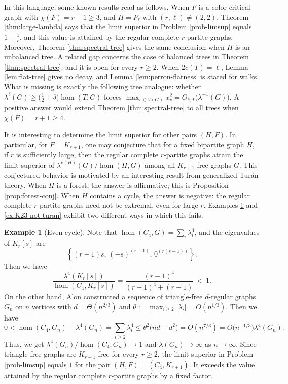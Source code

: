 \documentclass[11pt, a4paper]{article}
\theoremstyle{definition}
\newtheorem{example}[theorem]{Example}
\theoremstyle{plain}
\renewcommand{\le}{\leqslant}
\renewcommand{\ge}{\geqslant}
\begin{document}
In this language, some known results read as follows.
When $F$ is a color-critical graph with
$\chi (F)=r+1\ge 3$, and $H=P_\ell$ with $(r,\ell) \neq (2,2)$, Theorem \ref{thm:large-lambda} says that the limit superior in
Problem \ref{prob-limsup} equals $1-\frac{1}{r}$, and this value is attained by
the regular complete $r$-partite graphs. Moreover, Theorem \ref{thm:spectral-tree} gives the same conclusion when $H$ is an unbalanced tree.  
A related gap concerns the case of balanced trees in Theorem \ref{thm:spectral-tree}, and
it is open for every $r\ge 2$. When $2c(T)=\ell$, Lemma \ref{lem:flat-tree}
gives no decay, and Lemma \ref{lem:perron-flatness} is stated for walks. What is missing is exactly the following
tree analogue: whether
$\lambda^{\ell}(G)\ge \bigl(\frac12+\delta \bigr)\hom (T,G)$ forces
$\max_{v\in V(G)}x_v^{2}=O_{\delta ,T}\bigl(\lambda^{-1}(G)\bigr)$. 
A positive answer would extend Theorem \ref{thm:spectral-tree} to all trees when
$\chi (F)=r+1 \ge 4$. 



\smallskip 
 It is interesting to determine the limit superior for other pairs $(H, F)$. In particular, for $F=K_{r+1}$, 
one may conjecture that for a fixed bipartite graph $H$, if $r$ is sufficiently large, then the regular complete $r$-partite graphs attain the limit superior of $\lambda^{v(H)}(G)/ \hom (H,G)$ among all $K_{r+1}$-free graphs $G$.  
 This conjectured behavior is motivated by an interesting result \cite{MNNRW2023} from generalized Tur\'{a}n theory.  
When $H$ is a forest, the answer is affirmative; this is
Proposition \ref{prop:forest-conj}. When $H$
contains a cycle, the answer is negative: the regular complete $r$-partite graphs need not be extremal, 
even for large $r$.  
Examples \ref{ex:C4-not-turan} and \ref{ex:K23-not-turan} exhibit two different ways in which this fails.


\begin{example}[Even cycle] \label{ex:C4-not-turan} 
Note that $\hom (C_4,G) =\sum_i\lambda_i^4$, and the eigenvalues of $K_r[s]$ are  
$$\left\{ (r-1)s,\,(-s)^{(r-1)},\,0^{(r(s-1))} \right\}. $$
Then  we have 
\[  \frac{\lambda^{4}(K_r[s])}{\hom (C_4,K_r[s])}
  =\frac{(r-1)^{4}}{(r-1)^{4}+(r-1)}
  \ <\ 1 .
\]
On the other hand, Alon \cite[Theorem 2.1]{Alon1994} constructed a sequence of triangle-free $d$-regular graphs $G_n$ on
$n$ vertices with $d=\Theta (n^{2/3})$ and
$\theta :=\max_{i\ge 2}|\lambda_i|=O(n^{1/3})$. Then we have 
\[ 0 <  
  \hom (C_4,G_n)-\lambda^{4}(G_n)
  =\sum_{i\ge 2}\lambda_i^{4}
  \le \theta^{2}\bigl(nd-d^{2}\bigr) = O(n^{7/3}) 
  =O\bigl(n^{-1/3}\bigr)\lambda^{4}(G_n).
\]
Thus, we get $\lambda^4(G_n)/ \hom (C_4,G_n) \to 1$ and $\lambda(G_n) \to \infty$ as $n \to \infty$. 
Since triangle-free graphs are $K_{r+1}$-free for every $r\ge 2$, the limit superior in Problem \ref{prob-limsup} equals $1$ for the pair $(H, F)=(C_4, K_{r+1})$. 
It exceeds the value attained by the regular
complete $r$-partite graphs by a fixed factor. 
\end{example}
\end{document}
